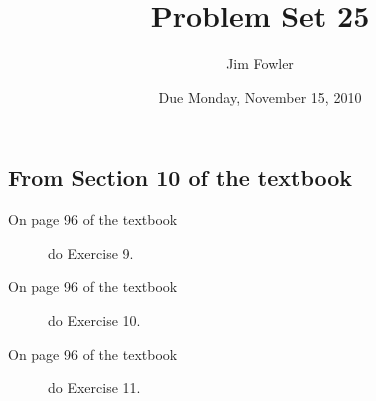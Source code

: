 \documentclass[12pt]{handout}
\author{Jim Fowler}
\title{Problem Set 25}
\date{Due Monday, November 15, 2010}
\begin{document}
\maketitle










\subsection*{From Section 10 of the textbook}



\begin{description}

\item[On page 96 of the textbook] do Exercise 9.

\item[On page 96 of the textbook] do Exercise 10.

\item[On page 96 of the textbook] do Exercise 11.

\end{description}
\end{document}
